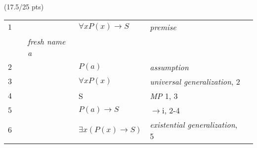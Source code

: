 \documentclass[a4paper,12pt]{article}
\begin{document}
\hfill \small{(17.5/25 pts)}\\
\begin{tcolorbox}

\begin{table}[H]
    \centering
	\begin{tabular}{*6{l}}
	
	
	
	$1$ & & & $\forall xP(x) \rightarrow S$ & \textit{premise} & \\ \cline{1-6}
	
	    & & \textit{fresh name a} & & & \\ \cline{2-5}
	
	$2$ & & & $P(a)$ & \textit{assumption} & \\ 
	
	$3$ & & & $\forall x P(x)$ & \textit{universal generalization}, 2 & \\
	
	$4$ & & & S & \textit{MP} 1, 3 & \\  \cline{2-5}
	
	$5$ & & & $P(a) \rightarrow S$ & $\rightarrow$i, 2-4 & \\ \cline{1-6}
	
	$6$ & & & $\exists x(P(x) \rightarrow S)$ & \textit{existential generalization}, 5 & \\ 
	
	
\end{tabular}
\end{table}

\end{tcolorbox}
\end{document}
